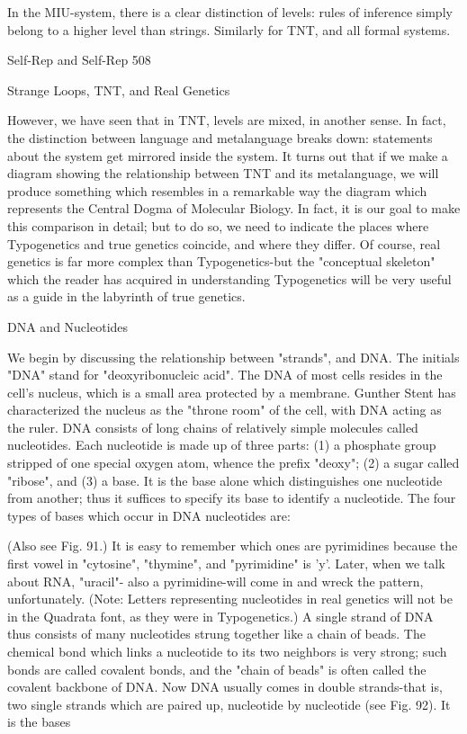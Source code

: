 {In the MIU-system, there is a clear distinction of levels: rules of inference simply belong to a
higher level than strings. Similarly for TNT, and all formal systems.




Self-Rep and Self-Rep                                                                        508

                          Strange Loops, TNT, and Real Genetics

However, we have seen that in TNT, levels are mixed, in another sense. In fact, the
distinction between language and metalanguage breaks down: statements about the system
get mirrored inside the system. It turns out that if we make a diagram showing the
relationship between TNT and its metalanguage, we will produce something which resembles
in a remarkable way the diagram which represents the Central Dogma of Molecular Biology.
In fact, it is our goal to make this comparison in detail; but to do so, we need to indicate the
places where Typogenetics and true genetics coincide, and where they differ. Of course, real
genetics is far more complex than Typogenetics-but the "conceptual skeleton" which the
reader has acquired in understanding Typogenetics will be very useful as a guide in the
labyrinth of true genetics.

                                    DNA and Nucleotides

We begin by discussing the relationship between "strands", and DNA. The initials "DNA"
stand for "deoxyribonucleic acid". The DNA of most cells resides in the cell's nucleus, which
is a small area protected by a membrane. Gunther Stent has characterized the nucleus as the
"throne room" of the cell, with DNA acting as the ruler. DNA consists of long chains of
relatively simple molecules called nucleotides. Each nucleotide is made up of three parts: (1)
a phosphate group stripped of one special oxygen atom, whence the prefix "deoxy"; (2) a
sugar called "ribose", and (3) a base. It is the base alone which distinguishes one nucleotide
from another; thus it suffices to specify its base to identify a nucleotide. The four types of
bases which occur in DNA nucleotides are:




(Also see Fig. 91.) It is easy to remember which ones are pyrimidines because the first vowel
in "cytosine", "thymine", and "pyrimidine" is 'y'. Later, when we talk about RNA, "uracil"-
also a pyrimidine-will come in and wreck the pattern, unfortunately. (Note: Letters
representing nucleotides in real genetics will not be in the Quadrata font, as they were in
Typogenetics.)
        A single strand of DNA thus consists of many nucleotides strung together like a chain
of beads. The chemical bond which links a nucleotide to its two neighbors is very strong;
such bonds are called covalent bonds, and the "chain of beads" is often called the covalent
backbone of DNA.
  Now DNA usually comes in double strands-that is, two single strands which are paired up,
nucleotide by nucleotide (see Fig. 92). It is the bases


}
